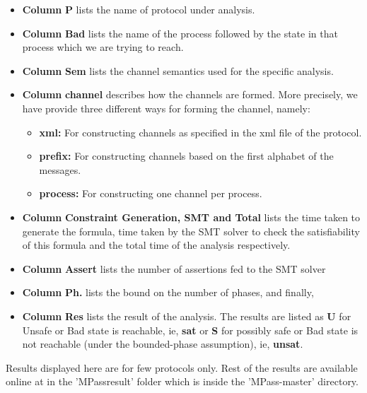 \begin{itemize}
\item {\bf Column} {\bf P} lists the name of protocol under analysis.
\item {\bf Column} {\bf Bad} lists the name of the process followed by the state in that process which we are trying to reach.
\item {\bf Column} {\bf Sem} lists the channel semantics used for the specific analysis.
\item {\bf Column} {\bf channel} describes how the    channels are formed.  More precisely, we have provide three different ways for forming the channel, namely:

\begin{itemize}
\item {\bf xml:}  For constructing  channels as specified in the xml  file of the protocol.
\item {\bf prefix:} For constructing channels based on the first alphabet of the messages.
\item {\bf process:} For constructing  one channel per process.
\end{itemize}

\item {\bf Column} {\bf Constraint Generation, SMT  and Total} lists the time taken to generate  the formula, time taken by the SMT solver to check the satisfiability of this formula and the total time of the analysis respectively.
\item {\bf Column} {\bf Assert} lists the number of assertions fed to the SMT solver
\item {\bf Column} {\bf Ph.} lists the bound on the number of phases, and finally,
\item {\bf Column} {\bf Res} lists the result of the analysis. The results are listed as {\bf U} for Unsafe or Bad state is reachable, ie, {\bf sat} or {\bf S} for possibly safe or Bad state is not reachable (under the bounded-phase assumption), ie, {\bf unsat}.


\end{itemize}
Results displayed here are for few protocols only. Rest of the results are available online at \cite{github.MPass} 
in the 'MPass\textunderscore result' folder which is inside the 'MPass-master' directory.



